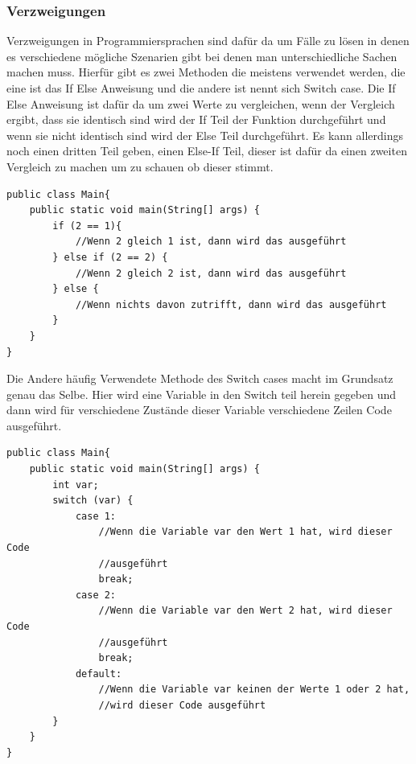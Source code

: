 \subsubsection{Verzweigungen}
Verzweigungen in Programmiersprachen sind dafür da um Fälle zu lösen in denen es verschiedene mögliche Szenarien gibt bei denen man unterschiedliche Sachen machen muss. Hierfür gibt es zwei Methoden die meistens verwendet werden, die eine ist das If Else Anweisung und die andere ist  nennt sich Switch case. Die If Else Anweisung ist dafür da um zwei Werte zu vergleichen, wenn der Vergleich ergibt, dass sie identisch sind wird der If Teil der Funktion durchgeführt und wenn sie nicht identisch sind wird der Else Teil durchgeführt. Es kann allerdings noch einen dritten Teil geben, einen Else-If Teil, dieser ist dafür da einen zweiten Vergleich zu machen um zu schauen ob dieser stimmt.
\begin{verbatim}
public class Main{
    public static void main(String[] args) {
        if (2 == 1){
            //Wenn 2 gleich 1 ist, dann wird das ausgeführt
        } else if (2 == 2) {
            //Wenn 2 gleich 2 ist, dann wird das ausgeführt
        } else {
            //Wenn nichts davon zutrifft, dann wird das ausgeführt
        }
    }
}
\end{verbatim}
Die Andere häufig Verwendete Methode des Switch cases macht im Grundsatz genau das Selbe. Hier wird eine Variable in den Switch teil herein gegeben und dann wird für verschiedene Zustände dieser Variable verschiedene Zeilen Code ausgeführt\cite{programmieren_lernen_java_2021}.
\begin{verbatim}
public class Main{
    public static void main(String[] args) {
        int var;
        switch (var) {
            case 1:
                //Wenn die Variable var den Wert 1 hat, wird dieser Code 
                //ausgeführt
                break;
            case 2:
                //Wenn die Variable var den Wert 2 hat, wird dieser Code 
                //ausgeführt
                break;
            default:
                //Wenn die Variable var keinen der Werte 1 oder 2 hat, 
                //wird dieser Code ausgeführt
        }
    }
}
\end{verbatim}

